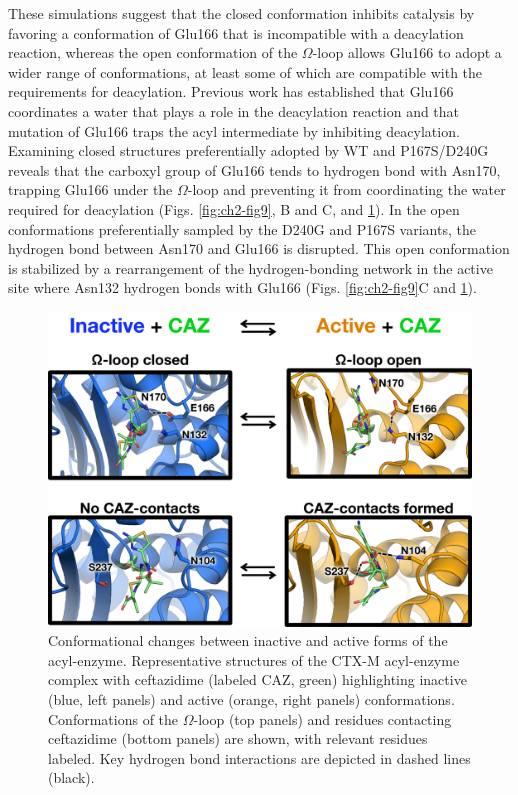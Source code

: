 \documentclass[../main.tex]{subfiles}
\begin{document}
        These simulations suggest that the closed conformation inhibits catalysis by favoring a conformation of Glu166 that is incompatible with a deacylation reaction, whereas the open conformation of the $\Omega$-loop allows Glu166 to adopt a wider range of conformations, at least some of which are compatible with the requirements for deacylation. Previous work has established that Glu166 coordinates a water that plays a role in the deacylation reaction\cite{chen_acylation_2007} and that mutation of Glu166 traps the acyl intermediate by inhibiting deacylation\cite{strynadka_molecular_1992}. Examining closed structures preferentially adopted by WT and P167S/D240G reveals that the carboxyl group of Glu166 tends to hydrogen bond with Asn170, trapping Glu166 under the $\Omega$-loop and preventing it from coordinating the water required for deacylation (Figs. \ref{fig:ch2-fig9}, B and C, and \ref{fig:ch2-fig10}). In the open conformations preferentially sampled by the D240G and P167S variants, the hydrogen bond between Asn170 and Glu166 is disrupted. This open conformation is stabilized by a rearrangement of the hydrogen-bonding network in the active site where Asn132 hydrogen bonds with Glu166 (Figs. \ref{fig:ch2-fig9}C and \ref{fig:ch2-fig10}).

        \begin{figure}[!htb] %
            \centering
            \includegraphics[width=5in]{ch2-fig10.png}
            \caption[Conformational changes between inactive and active forms of the acyl-enzyme.]
                {Conformational changes between inactive and active forms of the acyl-enzyme. Representative structures of the CTX-M acyl-enzyme complex with ceftazidime (labeled CAZ, green) highlighting inactive (blue, left panels) and active (orange, right panels) conformations. Conformations of the $\Omega$-loop (top panels) and residues contacting ceftazidime (bottom panels) are shown, with relevant residues labeled. Key hydrogen bond interactions are depicted in dashed lines (black).}
            \label{fig:ch2-fig10}
        \end{figure}
\end{document}

